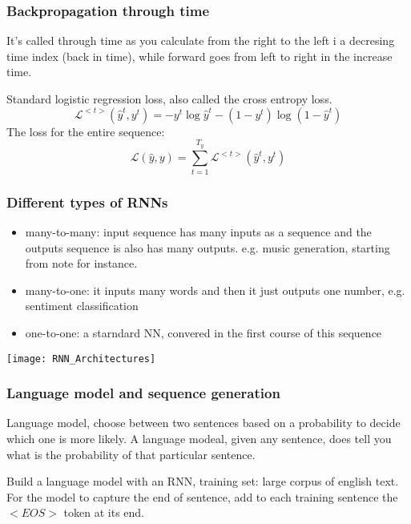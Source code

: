 \subsubsection{Backpropagation through time}
It's called through time as you calculate from the right to the left i a decresing time index (back in time), while forward goes from left to right in the increase time.

Standard logistic regression loss, also called the cross entropy loss.
\begin{equation*}
    \mathcal{L}^{<t>} (\hat{y}^{t}, y^{t}) = - y^{t} \log \hat{y}^{t} - (1 - y^{t}) \log(1 - \hat{y}^{t})
\end{equation*}
The loss for the entire sequence:
\begin{equation*}
    \mathcal{L} (\hat{y}, y) = \sum^{T_y}_{t=1} \mathcal{L}^{<t>} (\hat{y}^{t}, y^{t})
\end{equation*}

\subsubsection{Different types of RNNs}
\begin{itemize}
    \item many-to-many: input sequence has many inputs as a sequence and the outputs sequence is also has many outputs. e.g. music generation, starting from note for instance.
    \item many-to-one: it inputs many words and then it just outputs one number, e.g. sentiment classification
    \item one-to-one: a starndard NN, convered in the first course of this sequence
\end{itemize}

\texttt{[image: RNN\_Architectures]}

\subsubsection{Language model and sequence generation}
Language model, choose between two sentences based on a probability to decide which one is more likely. A language modeal, given any sentence, does tell you what is the probability of that particular sentence.

Build a language model with an RNN, training set: large corpus of english text. For the model to capture the end of sentence, add to each training sentence the $<EOS>$ token at its end.

